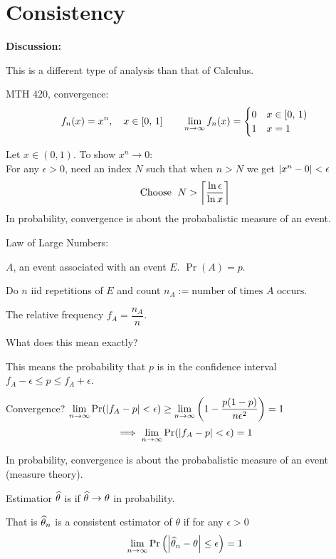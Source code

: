 \section{Consistency}
\textbf{Discussion: } 

\nl This is a different type of analysis than that of Calculus.

\example MTH 420,  convergence:
$$f_n(x) = x^n,\quad x \in [0,\,1] \qquad \lim_{n\to\infty} f_n(x) = \begin{cases}0 & x \in [0,\,1)\\ 1 & x = 1\end{cases}$$

\nl Let $x \in (0,1)$. To show $x^n \to 0$:\\
For any $\epsilon > 0$, need an index $N$ such that when $n > N$ we get $\abs{x^n - 0} < \epsilon$
$$\text{Choose } \; N > \ceiling{\frac{\ln \epsilon}{\ln x}}$$
In probability, convergence is about the probabalistic measure of an event.

\example Law of Large Numbers:

\nl $A$, an event associated with an event $E$. $\Pr(A) = p.$

\nl Do $n$ iid repetitions of $E$ and count $n_A := \text{number of times } A \text{ occurs}$.

\nl The relative frequency $f_A = \dfrac{n_A}{n}$. 

\nl What does this mean exactly? 

\nl {\color{ggreen}*} This means the probability that $p$ is in the confidence interval $f_A - \epsilon \leq p \leq f_A + \epsilon$.

\nl Convergence? $\displaystyle \limn \Pr(\abs{f_A-p} < \epsilon ) \geq \limn \pars{1-\frac{p(1-p)}{n\epsilon^2}} = 1$
$$\implies \lim_{n\to\infty} \Pr(\abs{f_A - p} < \epsilon) = 1$$
\begin{center}\end{center}

\nl In probability, convergence is about the probabalistic measure of an event (measure theory).

 Estimatior $\widehat{\theta}$ is  if $\widehat{\theta} \to \theta$ in probability.

\nl That is $\widehat{\theta}_n$ is a consistent estimator of $\theta$ if for any $\epsilon > 0$
$$\limn \P{\abs{\that_n - \theta} \leq \epsilon} = 1$$

